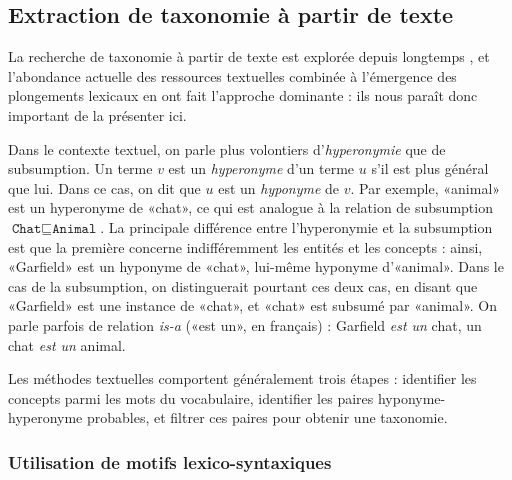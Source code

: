 \subsection{Extraction de taxonomie à partir de texte}
\label{subsec:litt-te-text}

La recherche de taxonomie à partir de texte est explorée depuis longtemps \cite{hearst1992automatic}, et l'abondance actuelle des ressources textuelles \cite{gigaword2012, smith2013dirt} combinée à l'émergence des plongements lexicaux en ont fait l'approche dominante : ils nous paraît donc important de la présenter ici.


Dans le contexte textuel, on parle plus volontiers d'\textit{hyperonymie} que de subsumption. Un terme $v$ est un \textit{hyperonyme} d'un terme $u$ s'il est plus général que lui. Dans ce cas, on dit que $u$ est un \textit{hyponyme} de $v$. Par exemple, «animal» est un hyperonyme de «chat», ce qui est analogue à la relation de subsumption $\texttt{Chat} \sqsubseteq \texttt{Animal}$. La principale différence entre l'hyperonymie et la subsumption est que la première concerne indifféremment les entités et les concepts : ainsi, «Garfield» est un hyponyme de «chat», lui-même hyponyme d'«animal». Dans le cas de la subsumption, on distinguerait pourtant ces deux cas, en disant que «Garfield» est une instance de «chat», et «chat» est subsumé par «animal». On parle parfois de relation \textit{is-a} («est un», en français) : Garfield \textit{est un} chat, un chat \textit{est un} animal.

Les méthodes textuelles comportent généralement trois étapes : identifier les concepts parmi les mots du vocabulaire, identifier les paires hyponyme-hyperonyme probables, et filtrer ces paires pour obtenir une taxonomie.


\subsubsection{Utilisation de motifs lexico-syntaxiques}

